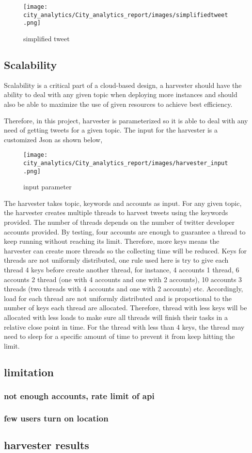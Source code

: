 \begin{figure}[h!]
\centering
\texttt{[image: city\_analytics/City\_analytics\_report/images/simplifiedtweet.png]}
\caption{simplified tweet}
\label{fig:stream}
\end{figure}


\subsection{Scalability}

Scalability is a critical part of a cloud-based design, a harvester should have the ability to deal with any given topic when deploying more instances and should also be able to maximize the use of given resources to achieve best efficiency.

Therefore, in this project, harvester is parameterized so it is able to deal with any need of getting tweets for a given topic. The input for the harvester is a customized Json as shown below,

\begin{figure}[h!]
\centering
\texttt{[image: city\_analytics/City\_analytics\_report/images/harvester\_input.png]}
\caption{input parameter}
\label{fig:input parameter}
\end{figure}


The harvester takes topic, keywords and accounts as input. For any given topic, the harvester creates multiple threads to harvest tweets using the keywords provided. The number of threads depends on the number of twitter developer accounts provided. By testing, four accounts are enough to guarantee a thread to keep running without reaching its limit. Therefore, more keys means the harvester can create more threads so the collecting time will be reduced. Keys for threads are not uniformly distributed, one rule used here is try to give each thread 4 keys before create another thread, for instance, 4 accounts 1 thread, 6 accounts 2 thread (one with 4 accounts and one with 2 accounts), 10 accounts 3 threads (two threads with 4 accounts and one with 2 accounts) etc. Accordingly, load for each thread are not uniformly distributed and is proportional to the number of keys each thread are allocated. Therefore, thread with less keys will be allocated with less loads to make sure all threads will finish their tasks in a relative close point in time. For the thread with less than 4 keys, the thread may need to sleep for a specific amount of time to prevent it from keep hitting the limit.


\subsection{limitation}
\subsubsection{not enough accounts, rate limit of api}

\subsubsection{few users turn on location}
\subsection{harvester results}